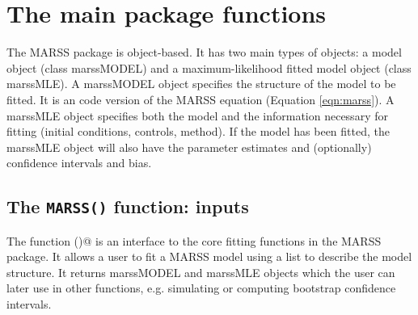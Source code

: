 \chapter{The main package functions}
\label{chap:mainfunctions}
The MARSS package is object-based.  It has two main types of objects: a model object (class marssMODEL) and a maximum-likelihood fitted model object (class marssMLE). A marssMODEL object specifies the structure of the model to be fitted.  It is an \R code version of the MARSS equation (Equation \ref{eqn:marss}).  A marssMLE object specifies both the model and the information necessary for fitting (initial conditions, controls, method).  If the model has been fitted, the marssMLE object will also have the parameter estimates and (optionally) confidence intervals and bias.  

\section{The \texttt{MARSS()} function: inputs}
The function \verb@MARSS()@ is an interface to the core fitting functions in the MARSS package.  It allows a user to fit a MARSS model using a list to describe the model structure.  It returns marssMODEL and marssMLE objects which the user can later use in other functions, e.g. simulating or computing bootstrap confidence intervals.

